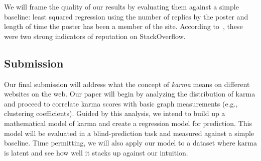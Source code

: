\documentclass[11pt]{article}
\begin{document}
We will frame the quality of our results by evaluating them against a simple
baseline: least squared regression using the number of replies by the poster and
length of time the poster has been a member of the site. According
to~\cite{movshovitzanalysis}, these were two strong indicators of reputation on
StackOverflow. 

\subsection{Submission}
Our final submission will address what the concept of \textit{karma} means on
different websites on the web. Our paper will begin by analyzing the
distribution of karma and proceed to correlate karma scores with basic graph
measurements (e.g., clustering coefficients). Guided by this analysis, we intend
to build up a mathematical model of karma and create a regression model for
prediction. This model will be evaluated in a blind-prediction task and measured
against a simple baseline. Time permitting, we will also apply our
model to a dataset where karma is latent and see how well it stacks up
against our intuition.

{} 
\end{document}
